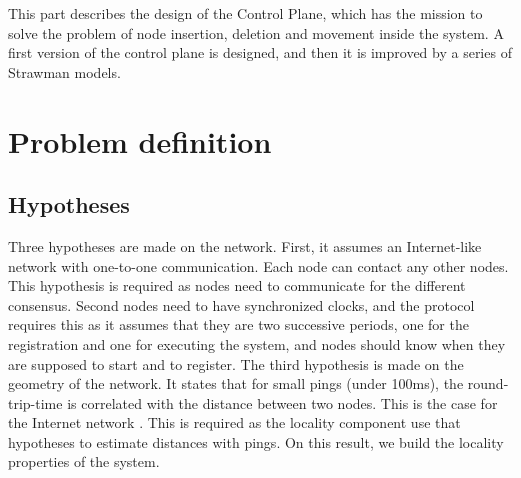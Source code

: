 \documentclass[a4paper,11pt,twoside,openright]{report}
\begin{document}
This part describes the design of the Control Plane, which has the mission
to solve the problem of node insertion, deletion and movement inside the
system. A first version of the control plane is designed, and then it is improved by a series of Strawman models.

\section{Problem definition}

\subsection{Hypotheses}
Three hypotheses are made on the network. First, it assumes an Internet-like
network with one-to-one communication. Each node can contact any other nodes. This hypothesis is required as nodes need to communicate for the different consensus. 
Second nodes need to have synchronized clocks, and the protocol requires this as it assumes that they are two successive periods, one for the registration and one for executing the system, and nodes should know when they are supposed to start and to register. 
 The third hypothesis is made on the
geometry of the network. It states that for small pings (under 100ms), the
round-trip-time is correlated with the distance between two nodes. This is the
case for the Internet network \cite{Seibert2014}. This is required as the locality component use that hypotheses to estimate distances with pings. On this result, we build the
locality properties of the system. 
\end{document}

